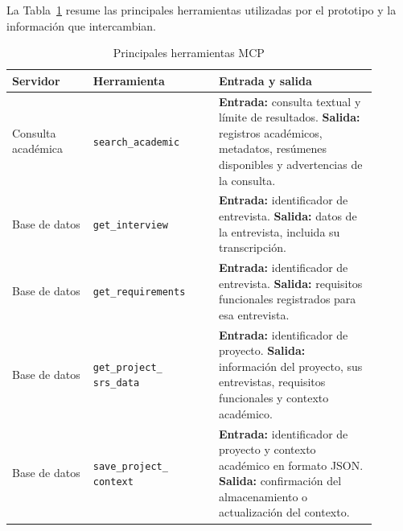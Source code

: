 La Tabla~\ref{tab:herramientas-mcp} resume las principales
herramientas utilizadas por el prototipo y la información
que intercambian.
\begin{table}[H]
    \centering
    \caption{Principales herramientas MCP }
    \label{tab:herramientas-mcp}

    \begingroup
    \small
    \setlength{\parskip}{0pt}
    \setlength{\tabcolsep}{4pt}
    \renewcommand{\arraystretch}{1.15}

    \begin{tabular}{
        |>{\raggedright\arraybackslash}p{0.20\linewidth}
        |>{\raggedright\arraybackslash}p{0.31\linewidth}
        |>{\raggedright\arraybackslash}p{0.39\linewidth}|
    }
        \hline
        \textbf{Servidor} &
        \textbf{Herramienta} &
        \textbf{Entrada y salida} \\
        \hline

        Consulta académica &
        \texttt{search\_academic} &
        \textbf{Entrada:} consulta textual y límite
        de resultados.
        \newline
        \textbf{Salida:} registros académicos,
        metadatos, resúmenes disponibles
        y advertencias de la consulta. \\
        \hline

        Base de datos &
        \texttt{get\_interview} &
        \textbf{Entrada:} identificador de entrevista.
        \newline
        \textbf{Salida:} datos de la entrevista,
        incluida su transcripción. \\
        \hline

        Base de datos &
        \texttt{get\_requirements} &
        \textbf{Entrada:} identificador de entrevista.
        \newline
        \textbf{Salida:} requisitos funcionales
        registrados para esa entrevista. \\
        \hline

        Base de datos &
        \texttt{get\_project\_}\newline
        \texttt{srs\_data} &
        \textbf{Entrada:} identificador de proyecto.
        \newline
        \textbf{Salida:} información del proyecto,
        sus entrevistas, requisitos funcionales
        y contexto académico. \\
        \hline

        Base de datos &
        \texttt{save\_project\_}\newline
        \texttt{context} &
        \textbf{Entrada:} identificador de proyecto
        y contexto académico en formato JSON.
        \newline
        \textbf{Salida:} confirmación del
        almacenamiento o actualización del contexto. \\
        \hline


\end{tabular}
\end{table}
